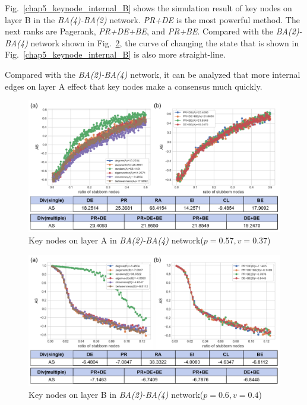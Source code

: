 Fig.~\ref{chap5_keynode_internal_B} shows the simulation result of key nodes on layer B in the \textit{BA(4)-BA(2)} network. \textit{PR+DE} is the most powerful method. The next ranks are Pagerank, \textit{PR+DE+BE}, and \textit{PR+BE}. Compared with the \textit{BA(2)-BA(4)} network shown in Fig.~\ref{chap5_keynode_internal_B2}, the curve of changing the state that is shown in Fig.~\ref{chap5_keynode_internal_B} is also more straight-line. 

Compared with the \textit{BA(2)-BA(4)} network, it can be analyzed that more internal edges on layer A effect that key nodes make a consensus much quickly. 

\begin{figure}[!htb]
	\centering
	\includegraphics[width=\hsize]{figure/chap5_keynode_internal_A2.png}
	\caption{Key nodes on layer A in \textit{BA(2)-BA(4)} network($p=0.57, v=0.37$)}
	\label{chap5_keynode_internal_A2}
\end{figure}
\begin{figure}[!htb]
	\centering
	\includegraphics[width=\hsize]{figure/chap5_keynode_internal_B2.png}
	\caption{Key nodes on layer B in \textit{BA(2)-BA(4)} network($p=0.6, v=0.4$)}
	\label{chap5_keynode_internal_B2}
\end{figure}

